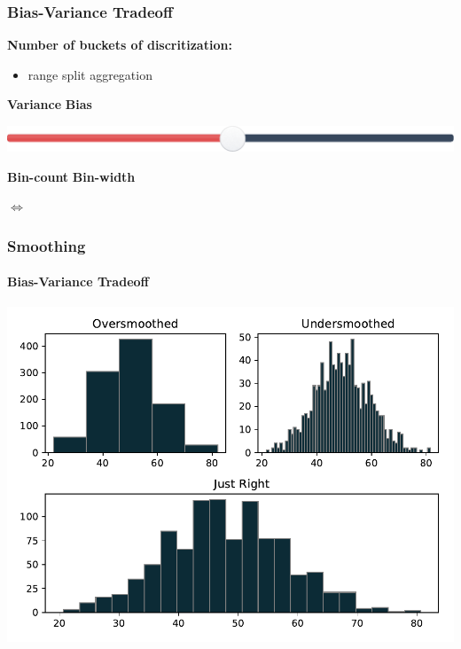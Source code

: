 \documentclass[mathserif]{beamer}
\begin{document}
    \begin{frame}
        \frametitle{Bias-Variance Tradeoff}

        {\Large \textbf{Number of buckets of discritization:}}
        \begin{itemize}
            \item range split aggregation
        \end{itemize}

        \LARGE \textbf{\textcolor{maraschino}{Variance}}
        \hfill
        \LARGE \textbf{\textcolor{navydarkblue}{Bias}}

        \includegraphics[width=1\columnwidth]{res/slider.pdf}

        \LARGE \textbf{\textcolor{maraschino}{Bin-count}}
        \hfill
        \LARGE \textbf{\textcolor{navydarkblue}{Bin-width}}

        \center \LARGE $\Longleftrightarrow$

    \end{frame}


    \begin{frame}
        \frametitle{Smoothing}
        \framesubtitle{Bias-Variance Tradeoff}

        \begin{center}
            \includegraphics[scale=0.55]{res/over-under-smoothed.pdf}
        \end{center}

    \end{frame}
\end{document}

